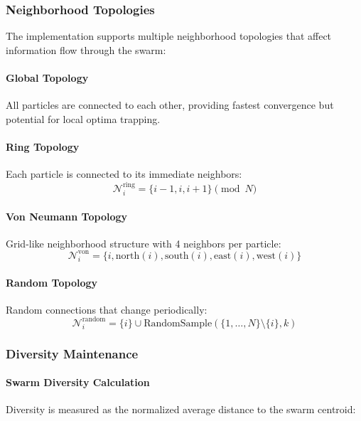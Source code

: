\documentclass[12pt,a4paper]{article}
\begin{document}
\subsubsection{Neighborhood Topologies}

The implementation supports multiple neighborhood topologies that affect information flow through the swarm:

\paragraph{Global Topology}
All particles are connected to each other, providing fastest convergence but potential for local optima trapping.

\paragraph{Ring Topology}
Each particle is connected to its immediate neighbors:
\begin{equation}
\mathcal{N}_i^{\text{ring}} = \{i-1, i, i+1\} \pmod{N} \label{eq:ring_neighborhood}
\end{equation}

\paragraph{Von Neumann Topology}
Grid-like neighborhood structure with 4 neighbors per particle:
\begin{equation}
\mathcal{N}_i^{\text{von}} = \{i, \text{north}(i), \text{south}(i), \text{east}(i), \text{west}(i)\} \label{eq:von_neumann_neighborhood}
\end{equation}

\paragraph{Random Topology}
Random connections that change periodically:
\begin{equation}
\mathcal{N}_i^{\text{random}} = \{i\} \cup \text{RandomSample}(\{1,\ldots,N\} \setminus \{i\}, k) \label{eq:random_neighborhood}
\end{equation}

\subsubsection{Diversity Maintenance}

\paragraph{Swarm Diversity Calculation}
Diversity is measured as the normalized average distance to the swarm centroid:
\end{document}
